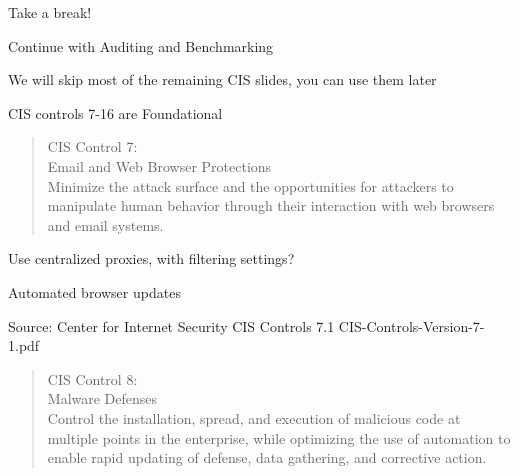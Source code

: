 \documentclass[Screen16to9,17pt]{foils}
\begin{document}







\centerline{\Large Take a break!}






\begin{list1}
\item Continue with Auditing and Benchmarking
\item We will skip most of the remaining CIS slides, you can use them later
\end{list1}



CIS controls 7-16 are Foundational

\begin{quote}
CIS Control 7:\\
Email and Web Browser Protections\\
Minimize the attack surface and the opportunities for attackers to manipulate human behavior through their interaction with web browsers and email systems.
\end{quote}

\begin{list1}
\item Use centralized proxies, with filtering settings?
\item Automated browser updates
\item
\item
\end{list1}

Source: Center for Internet Security CIS Controls 7.1 CIS-Controls-Version-7-1.pdf


\begin{quote}
CIS Control 8:\\
Malware Defenses\\
Control the installation, spread, and execution of malicious code at multiple points in the enterprise, while optimizing the use of automation to enable rapid updating of defense, data gathering, and corrective action.
\end{quote}
\end{document}
